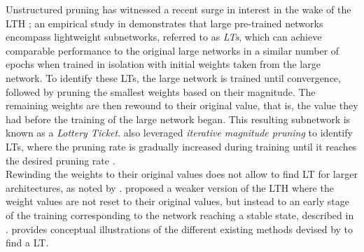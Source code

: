 Unstructured pruning has witnessed a recent surge in interest in the wake of the
\ac{LTH} \cite{DBLP:conf/iclr/FrankleC19}; an empirical study in
\cite{DBLP:conf/iclr/FrankleC19} demonstrates that large pre-trained networks
encompass lightweight subnetworks, referred to as \textit{\acp{LT}}, which can
achieve comparable performance to the original large networks in a similar
number of epochs when trained in isolation with initial weights taken from the
large network. To identify these \acp{LT}, the large network is trained until
convergence, followed by pruning the smallest weights based on their magnitude.
The remaining weights are then rewound to their original value, that is, the
value they had before the training of the large network began. This resulting
subnetwork is known as a \textit{Lottery Ticket}.
\citeauthor{DBLP:conf/iclr/FrankleC19} also leveraged \emph{iterative magnitude
pruning} to identify \acp{LT}, where the pruning rate is gradually increased
during training until it reaches the desired pruning rate
\cite{DBLP:conf/iclr/FrankleC19}.\\

Rewinding the weights to their original values does not allow to find \ac{LT}
for larger architectures, as noted by
\cite{DBLP:conf/iclr/LiuSZHD19,DBLP:journals/corr/abs-1902-09574}.
\citeauthor{DBLP:conf/iclr/FrankleC19} proposed a weaker version of the \ac{LTH}
where the weight values are not reset to their original values, but instead to
an early stage of the training corresponding to the network reaching a stable
state, described in \cite{DBLP:conf/icml/FrankleD0C20}.
 provides conceptual illustrations of the different
existing methods devised by \citeauthor{DBLP:conf/iclr/FrankleC19} to find a
\ac{LT}.\\


